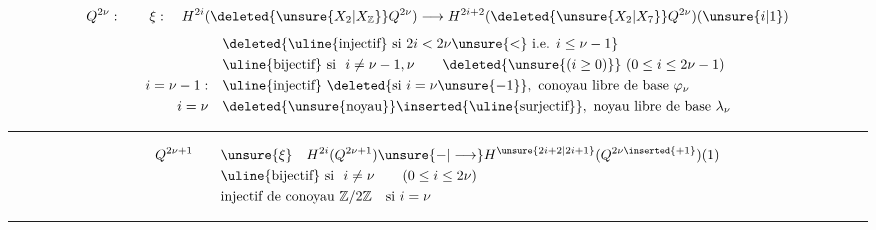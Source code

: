 \[
Q^{2\nu}:\qquad \xi:\quad
H^{2i}(\deleted{\unsure{X_{2}|X_{\mathbb Z}}}Q^{2\nu})\longrightarrow
H^{2i+2}(\deleted{\unsure{X_{2}|X_{7}}}Q^{2\nu})(\unsure{i|1})
\]
\[
\begin{aligned}
&\deleted{\text{\uline{injectif} si }2i<2\nu\unsure{<}\ \text{i.e. }i\leq\nu-1}\\
&\text{\uline{bijectif} si }\ i\ne\nu-1,\nu
\qquad \deleted{\unsure{(i\geq0)}}\ (0\leq i\leq2\nu-1)\\
i=\nu-1:\quad &\text{\uline{injectif} }\deleted{\text{si }i=\nu\unsure{{-}1}},\
 \text{conoyau libre de base }\varphi_{\nu}\\
i=\nu\quad &\deleted{\text{\unsure{noyau}}}\text{\inserted{\uline{surjectif}}},\
 \text{noyau libre de base }\lambda_{\nu}
\end{aligned}
\]
\noindent\rule{.40\linewidth}{.4pt}

\[
\begin{aligned}
Q^{2\nu+1}\qquad
&\unsure{\xi}\quad H^{2i}(Q^{2\nu+1})\unsure{-|\longrightarrow}H^{\unsure{2i+2|2i+1}}(Q^{2\nu\inserted{+1}})(1)\\
&\text{\uline{bijectif} si }\ i\ne\nu\qquad (0\leq i\leq2\nu)\\
&\text{injectif de conoyau }\mathbb Z/2\mathbb Z\quad\text{si }i=\nu
\end{aligned}
\]
\noindent\rule{.83\linewidth}{.4pt}
